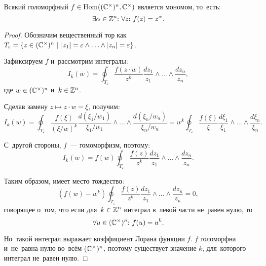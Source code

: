 \documentclass{article}
\begin{document}
\begin{lemma*}
    Всякий голоморфный $f \in \mathrm{Hom}((\mathbb{C}^\times)^n, \mathbb{C}^\times)$ является мономом, то~есть:
    $$
        \exists \alpha \in \mathbb{Z}^n{:}\ \forall z{:}\ f(z) = z^\alpha.
    $$
\end{lemma*}

\begin{proof}

Обозначим вещественный тор как $T_\varepsilon = \{ z \in (\mathbb{C}^\times)^n\ |\ |z_1| = \varepsilon \wedge \ldots \wedge |z_n| = \varepsilon \}$.

Зафиксируем $f$ и~рассмотрим интегралы:
$$
    I_k(w) = \oint_{T_\varepsilon} \frac{f(z \cdot w)}{z^k} \frac{dz_1}{z_1} \wedge \ldots \wedge \frac{dz_n}{z_n},
$$
где $w \in (\mathbb{C}^\times)^n$ и~$k \in \mathbb{Z}^n$.

Сделав замену $z \mapsto z \cdot w = \xi$, получим:
$$
    I_k(w) = \oint_{T_\varepsilon} \frac{f(\xi)}{(\xi / w)^k} \frac{d(\xi_1 / w_1)}{\xi_1 / w_1} \wedge \ldots \wedge \frac{d(\xi_n / w_n)}{\xi_n / w_n}
           = w^k \oint_{T_\varepsilon} \frac{f(\xi)}{\xi} \frac{d\xi_1}{\xi_1} \wedge \ldots \wedge \frac{d\xi_n}{\xi_n}.
$$

С~другой стороны, $f$~— гомоморфизм, поэтому:
$$
    I_k(w) = f(w) \oint_{T_\varepsilon} \frac{f(z)}{z^k} \frac{dz_1}{z_1} \wedge \ldots \wedge \frac{dz_n}{z_n}.
$$

Таким образом, имеет место тождество:
$$
    (f(w) - w^k) \oint_{T_\varepsilon} \frac{f(z)}{z^k} \frac{dz_1}{z_1} \wedge \ldots \wedge \frac{dz_n}{z_n} = 0,
$$
говорящее о~том, что если для~$k \in \mathbb{Z}^n$ интеграл в~левой части не~равен нулю, то
$$
    \forall u \in (\mathbb{C}^\times)^n{:}\ f(u) = u^k.
$$

Но~такой интеграл выражает коэффициент Лорана функции $f$. $f$ голоморфна и~не~равна нулю
во~всём $(\mathbb{C}^\times)^n$, поэтому существует значение $k$, для~которого интеграл не~равен нулю.

\end{proof}
\end{document}
